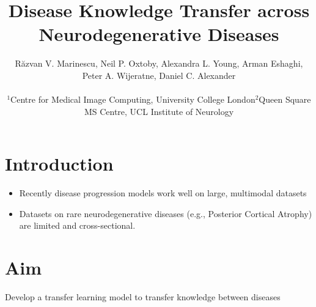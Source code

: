 \documentclass[portrait,a0,final,19pt]{a0poster}
\title{Disease Knowledge Transfer across Neurodegenerative Diseases}
\author{\Large{R\u{a}zvan V. Marinescu\inst{1}, Neil P. Oxtoby\inst{1}, Alexandra L. Young\inst{1}, Arman Eshaghi\inst{2}, Peter A. Wijeratne\inst{1}, Daniel C. Alexander\inst{1}}\\
\begin{tabular}{l p{1cm} l p{1cm} l}
\large{$^1$Centre for Medical Image Computing, University College London}  & & \large{$^2$Queen Square MS Centre, UCL Institute of Neurology} \\
\end{tabular}
}
\begin{document}

\begin{minipage}{50cm}					%
\maketitle
\end{minipage}

\begin{multicols}{2}							
\raggedcolumns							%


\vspace{-3em}
\section*{Introduction}



\begin{itemize}
 \item Recently disease progression models work well on large, multimodal datasets
 \item Datasets on rare neurodegenerative diseases (e.g., Posterior Cortical Atrophy) are limited and cross-sectional.
\end{itemize}


\section*{Aim}

Develop a transfer learning model to transfer knowledge between diseases 








\end{multicols}
\end{document}
